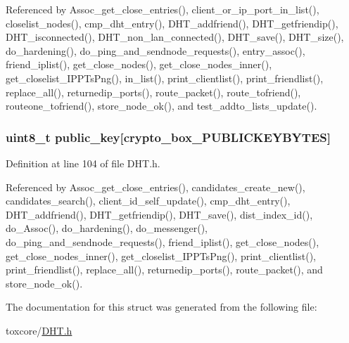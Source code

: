 Referenced by Assoc\+\_\+get\+\_\+close\+\_\+entries(), client\+\_\+or\+\_\+ip\+\_\+port\+\_\+in\+\_\+list(), closelist\+\_\+nodes(), cmp\+\_\+dht\+\_\+entry(), D\+H\+T\+\_\+addfriend(), D\+H\+T\+\_\+getfriendip(), D\+H\+T\+\_\+isconnected(), D\+H\+T\+\_\+non\+\_\+lan\+\_\+connected(), D\+H\+T\+\_\+save(), D\+H\+T\+\_\+size(), do\+\_\+hardening(), do\+\_\+ping\+\_\+and\+\_\+sendnode\+\_\+requests(), entry\+\_\+assoc(), friend\+\_\+iplist(), get\+\_\+close\+\_\+nodes(), get\+\_\+close\+\_\+nodes\+\_\+inner(), get\+\_\+closelist\+\_\+\+I\+P\+P\+Ts\+Png(), in\+\_\+list(), print\+\_\+clientlist(), print\+\_\+friendlist(), replace\+\_\+all(), returnedip\+\_\+ports(), route\+\_\+packet(), route\+\_\+tofriend(), routeone\+\_\+tofriend(), store\+\_\+node\+\_\+ok(), and test\+\_\+addto\+\_\+lists\+\_\+update().

\hypertarget{struct_client__data_aaa806bb1136fb3d4b5d8d8970b596ff7}{
\subsubsection[{public\+\_\+key}]{\setlength{\rightskip}{0pt plus 5cm}uint8\+\_\+t public\+\_\+key\mbox{[}crypto\+\_\+box\+\_\+\+P\+U\+B\+L\+I\+C\+K\+E\+Y\+B\+Y\+T\+E\+S\mbox{]}}}\label{struct_client__data_aaa806bb1136fb3d4b5d8d8970b596ff7}


Definition at line 104 of file D\+H\+T.\+h.



Referenced by Assoc\+\_\+get\+\_\+close\+\_\+entries(), candidates\+\_\+create\+\_\+new(), candidates\+\_\+search(), client\+\_\+id\+\_\+self\+\_\+update(), cmp\+\_\+dht\+\_\+entry(), D\+H\+T\+\_\+addfriend(), D\+H\+T\+\_\+getfriendip(), D\+H\+T\+\_\+save(), dist\+\_\+index\+\_\+id(), do\+\_\+\+Assoc(), do\+\_\+hardening(), do\+\_\+messenger(), do\+\_\+ping\+\_\+and\+\_\+sendnode\+\_\+requests(), friend\+\_\+iplist(), get\+\_\+close\+\_\+nodes(), get\+\_\+close\+\_\+nodes\+\_\+inner(), get\+\_\+closelist\+\_\+\+I\+P\+P\+Ts\+Png(), print\+\_\+clientlist(), print\+\_\+friendlist(), replace\+\_\+all(), returnedip\+\_\+ports(), route\+\_\+packet(), and store\+\_\+node\+\_\+ok().



The documentation for this struct was generated from the following file\+:\begin{DoxyCompactItemize}
\item 
toxcore/\hyperlink{_d_h_t_8h}{D\+H\+T.\+h}\end{DoxyCompactItemize}
